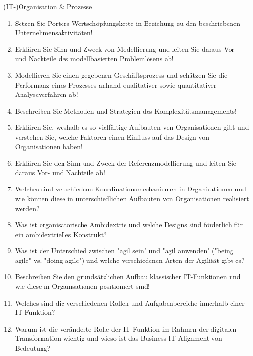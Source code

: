 \documentclass{article}
\begin{document}
\begin{exercise}{(IT-)Organisation \& Prozesse}
  \begin{enumerate}
    \item Setzen Sie Porters Wertschöpfungskette in Beziehung zu den beschriebenen Unternehmensaktivitäten!
    \item Erklären Sie Sinn und Zweck von Modellierung und leiten Sie daraus Vor- und Nachteile des modellbasierten Problemlösens ab!
    \item Modellieren Sie einen gegebenen Geschäftsprozess und schätzen Sie die Performanz eines Prozesses anhand qualitativer sowie quantitativer Analyseverfahren ab!
    \item Beschreiben Sie Methoden und Strategien des Komplexitätsmanagements!
    \item Erklären Sie, weshalb es so vielfältige Aufbauten von Organisationen gibt und verstehen Sie, welche Faktoren einen Einfluss auf das Design von Organisationen haben!
    \item Erklären Sie den Sinn und Zweck der Referenzmodellierung und leiten Sie daraus Vor- und Nachteile ab!
    \item Welches sind verschiedene Koordinationsmechanismen in Organisationen und wie können diese in unterschiedlichen Aufbauten von Organisationen realisiert werden?
    \item Was ist organisatorische Ambidextrie und welche Designs sind förderlich für ein ambidextrielles Konstrukt?
    \item Was ist der Unterschied zwischen "agil sein" und "agil anwenden" ("being agile" vs. "doing agile") und welche verschiedenen Arten der Agilität gibt es?
    \item Beschreiben Sie den grundsätzlichen Aufbau klassischer IT-Funktionen und wie diese in Organisationen positioniert sind!
    \item Welches sind die verschiedenen Rollen und Aufgabenbereiche innerhalb einer IT-Funktion?
    \item Warum ist die veränderte Rolle der IT-Funktion im Rahmen der digitalen Transformation wichtig und wieso ist das Business-IT Alignment von Bedeutung?
  \end{enumerate}


\end{exercise}
\end{document}
